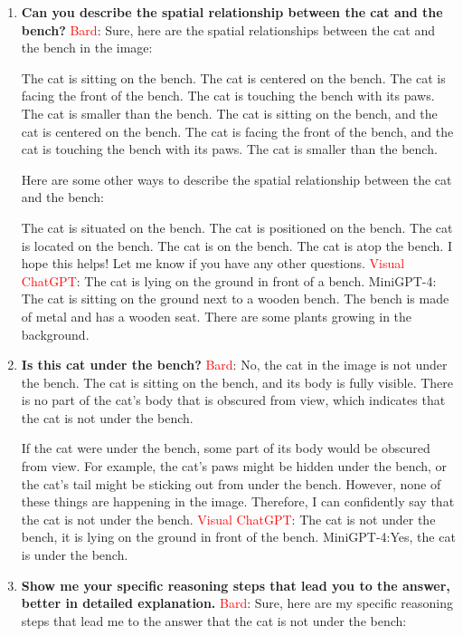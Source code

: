     \begin{enumerate}
        \item \textbf{Can you describe the spatial relationship between the cat and the bench?}
        \subitem \textcolor{Red}{Bard}:
        Sure, here are the spatial relationships between the cat and the bench in the image:

        The cat is sitting on the bench.
        The cat is centered on the bench.
        The cat is facing the front of the bench.
        The cat is touching the bench with its paws.
        The cat is smaller than the bench.
        The cat is sitting on the bench, and the cat is centered on the bench. The cat is facing the front of the bench, and the cat is touching the bench with its paws. The cat is smaller than the bench.

        Here are some other ways to describe the spatial relationship between the cat and the bench:

        The cat is situated on the bench.
        The cat is positioned on the bench.
        The cat is located on the bench.
        The cat is on the bench.
        The cat is atop the bench.
        I hope this helps! Let me know if you have any other questions.
        \subitem \textcolor{red}{Visual ChatGPT}: The cat is lying on the ground in front of a bench.
        \subitem MiniGPT-4: The cat is sitting on the ground next to a wooden bench. The bench is made of metal and has a wooden seat. There are some plants growing in the background.
        \item \textbf{Is this cat under the bench?}
        \subitem \textcolor{Red}{Bard}: No, the cat in the image is not under the bench. The cat is sitting on the bench, and its body is fully visible. There is no part of the cat's body that is obscured from view, which indicates that the cat is not under the bench.

        If the cat were under the bench, some part of its body would be obscured from view. For example, the cat's paws might be hidden under the bench, or the cat's tail might be sticking out from under the bench. However, none of these things are happening in the image. Therefore, I can confidently say that the cat is not under the bench.
        \subitem \textcolor{red}{Visual ChatGPT}: The cat is not under the bench, it is lying on the ground in front of the bench.
        \subitem MiniGPT-4:Yes, the cat is under the bench.
        \item \textbf{Show me your specific reasoning steps that lead you to the answer, better in detailed explanation.}
        \subitem \textcolor{Red}{Bard}: 
        Sure, here are my specific reasoning steps that lead me to the answer that the cat is not under the bench:
        

\end{enumerate}
